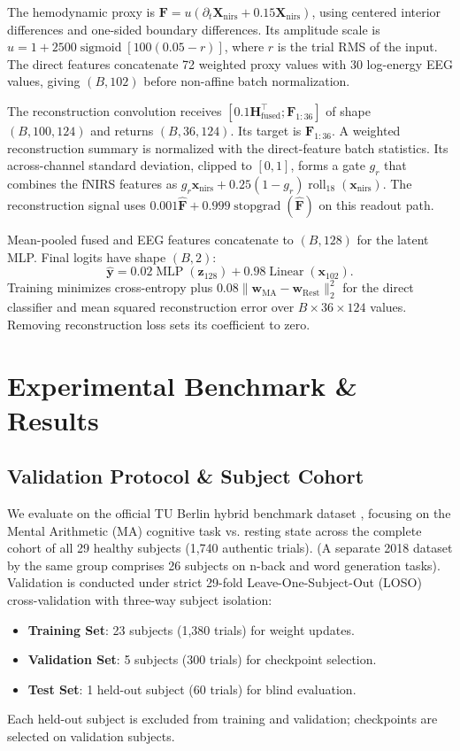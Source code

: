 \documentclass[journal]{IEEEtran}
\begin{document}
The hemodynamic proxy is $\mathbf{F}=u(\partial_t\mathbf{X}_{\mathrm{nirs}}+0.15\mathbf{X}_{\mathrm{nirs}})$, using centered interior differences and one-sided boundary differences. Its amplitude scale is $u=1+2500\operatorname{sigmoid}[100(0.05-r)]$, where $r$ is the trial RMS of the input. The direct features concatenate 72 weighted proxy values with 30 log-energy EEG values, giving $(B,102)$ before non-affine batch normalization.

The reconstruction convolution receives $[0.1\mathbf{H}_{\mathrm{fused}}^\top;\mathbf{F}_{1:36}]$ of shape $(B,100,124)$ and returns $(B,36,124)$. Its target is $\mathbf{F}_{1:36}$. A weighted reconstruction summary is normalized with the direct-feature batch statistics. Its across-channel standard deviation, clipped to $[0,1]$, forms a gate $g_r$ that combines the fNIRS features as $g_r\mathbf{x}_{\mathrm{nirs}}+0.25(1-g_r)\operatorname{roll}_{18}(\mathbf{x}_{\mathrm{nirs}})$. The reconstruction signal uses $0.001\hat{\mathbf{F}}+0.999\operatorname{stopgrad}(\hat{\mathbf{F}})$ on this readout path.

Mean-pooled fused and EEG features concatenate to $(B,128)$ for the latent MLP. Final logits have shape $(B,2)$:
\begin{equation}
\hat{\mathbf{y}}=0.02\operatorname{MLP}(\mathbf{z}_{128})+0.98\operatorname{Linear}(\mathbf{x}_{102}).
\end{equation}
Training minimizes cross-entropy plus $0.08\|\mathbf{w}_{\mathrm{MA}}-\mathbf{w}_{\mathrm{Rest}}\|_2^2$ for the direct classifier and mean squared reconstruction error over $B\times36\times124$ values. Removing reconstruction loss sets its coefficient to zero.

\section{Experimental Benchmark \& Results}

\subsection{Validation Protocol \& Subject Cohort}
We evaluate on the official TU Berlin hybrid benchmark dataset \cite{shin2017open}, focusing on the Mental Arithmetic (MA) cognitive task vs. resting state across the complete cohort of all 29 healthy subjects (1,740 authentic trials). (A separate 2018 dataset by the same group \cite{shin2018simultaneous} comprises 26 subjects on n-back and word generation tasks). Validation is conducted under strict 29-fold Leave-One-Subject-Out (LOSO) cross-validation with three-way subject isolation:
\begin{itemize}
    \item \textbf{Training Set}: 23 subjects (1,380 trials) for weight updates.
    \item \textbf{Validation Set}: 5 subjects (300 trials) for checkpoint selection.
    \item \textbf{Test Set}: 1 held-out subject (60 trials) for blind evaluation.
\end{itemize}
Each held-out subject is excluded from training and validation; checkpoints are selected on validation subjects.
\end{document}
